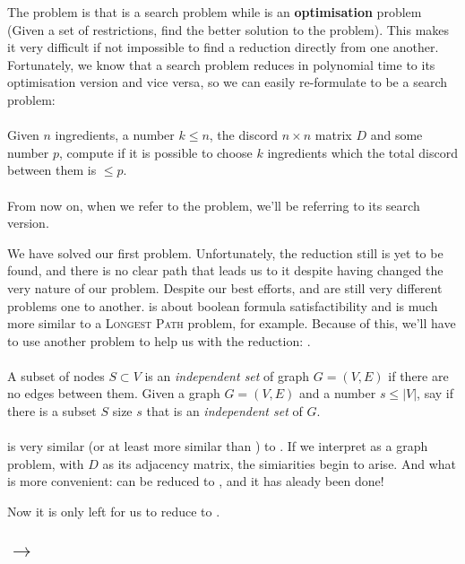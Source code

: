 The problem is that \tsat{} is a search problem while \exc{} is an \textbf{optimisation} problem (Given a set of restrictions, find the better solution to the problem). This makes it very difficult if not impossible to find a reduction directly from one another. Fortunately, we know that a search problem reduces in polynomial time to its optimisation version and vice versa\cite[p. 250]{algorithms}, so we can easily re-formulate \exc{} to be a search problem:

\paragraph{\exc{}}
Given $n$ ingredients, a number $k \leq n$, the discord $n \times n$ matrix $D$ and some number $p$, compute if it is possible to choose $k$ ingredients which the total discord between them is $\leq p$.
\\ \\
From now on, when we refer to the problem, we'll be referring to its search version.

We have solved our first problem. Unfortunately, the reduction still is yet to be found, and there is no clear path that leads us to it despite having changed the very nature of our problem. Despite our best efforts, \tsat{} and \exc{} are still very different problems one to another. \tsat{} is about boolean formula satisfactibility and \exc{} is much more similar to a \textsc{Longest Path} problem, for example. Because of this, we'll have to use another problem to help us with the reduction: \is{}.

\paragraph{\is{}}
A subset of nodes $S \subset V$ is an \textit{independent set} of graph $G = (V,E)$ if there are no edges between them. Given a graph $G = (V,E)$ and a number $s \leq |V|$, say if there is a subset $S$ size $s$ that is an \textit{independent set} of $G$.
\\ \\
\is{} is very similar (or at least more similar than \tsat{}) to \exc{}. If we interpret \exc{} as a graph problem, with $D$ as its adjacency matrix, the simiarities begin to arise. And what is more convenient: \tsat{} can be reduced to \is{}, and it has aleady been done\cite[p. 262]{algorithms}!

Now it is only left for us to reduce \is{} to \exc{}.

\subsection*{\is{} $\longrightarrow$ \exc{}}

